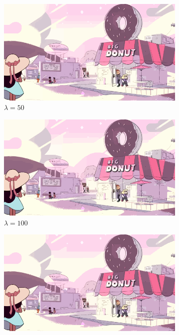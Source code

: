 \documentclass[10pt,twocolumn,letterpaper]{article}
\begin{document}
\begin{figure}
\centering
\begin{subfigure}{.48\linewidth}
\includegraphics[width=\linewidth]{alphaResults/transfered_050_001_13.png}
\caption{$\lambda = 50$}\label{fig:mouse}
\end{subfigure}
\begin{subfigure}{.48\linewidth}
\includegraphics[width=\linewidth]{alphaResults/transfered_100_001_13.png}
\caption{$\lambda = 100$}\label{fig:transfer100}
\end{subfigure}
\begin{subfigure}{.48\linewidth}
\includegraphics[width=\linewidth]{alphaResults/transfered_200_001_10.png}

\end{subfigure}
\end{figure}
\end{document}

